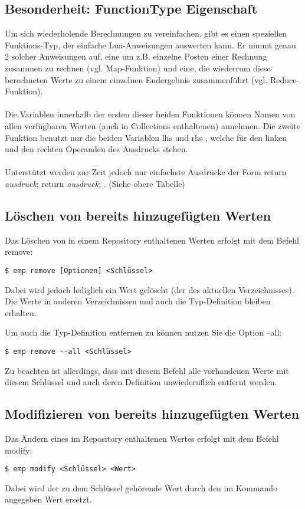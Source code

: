 \subsection{Besonderheit: FunctionType Eigenschaft}
Um sich wiederholende Berechnungen zu vereinfachen, gibt es einen speziellen Funktions-Typ, der einfache Lua-Anweisungen auswerten kann. Er nimmt genau 2 solcher Anweisungen auf, eine um z.B. einzelne Posten einer Rechnung zusammen zu rechnen (vgl. \grqq Map-Funktion\grqq) und eine, die wiederrum diese berechneten Werte zu einem einzelnen Endergebnis zusammenführt (vgl. \grqq Reduce-Funktion\grqq).
\\\\
Die Variablen innerhalb der ersten dieser beiden Funktionen können Namen von allen verfügbaren Werten (auch in Collections enthaltenen) annehmen. Die zweite Funktion benutzt nur die beiden Variablen \grqq lhs \grqq und \grqq rhs \grqq , welche für den linken und den rechten Operanden des Ausdrucks stehen.
\\\\
Unterstützt werden zur Zeit jedoch nur einfachste Ausdrücke der Form \grqq return \emph{ausdruck}; return \emph{ausdruck}; \grqq. (Siehe obere Tabelle)


\subsection{Löschen von bereits hinzugefügten Werten}
Das Löschen von in einem Repository enthaltenen Werten erfolgt mit dem Befehl remove:
\begin{lstlisting}[style=Bash]
$ emp remove [Optionen] <Schlüssel>
\end{lstlisting}

Dabei wird jedoch lediglich ein Wert gelöscht (der des aktuellen Verzeichnisses). Die Werte in anderen Verzeichnissen und auch die Typ-Definition bleiben erhalten.

Um auch die Typ-Definition entfernen zu können nutzen Sie die Option --all:
\begin{lstlisting}[style=Bash]
$ emp remove --all <Schlüssel>
\end{lstlisting}
Zu beachten ist allerdings, dass mit diesem Befehl alle vorhandenen Werte mit diesem Schlüssel und auch deren Definition unwiederuflich entfernt werden.

\subsection{Modifizieren von bereits hinzugefügten Werten}
Das Ändern eines im Repository enthaltenen Wertes erfolgt mit dem Befehl modify:
\begin{lstlisting}[style=Bash]
$ emp modify <Schlüssel> <Wert>
\end{lstlisting}
Dabei wird der zu dem Schlüssel gehörende Wert durch den im Kommando angegeben Wert ersetzt.

